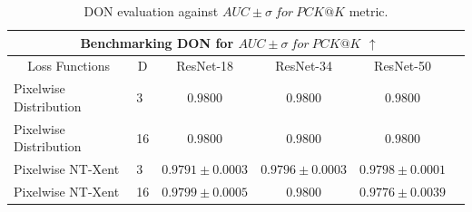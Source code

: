 \begin{table}[htb]
    \centering
    \begin{tabular}{lccccc}
        \hline
        \multicolumn{5}{c}{Benchmarking DON for $AUC \pm \sigma \ for \ PCK@K$ $\uparrow$}                                                                                                                 \\ \hline
        \multicolumn{1}{c}{Loss Functions}         & \multicolumn{1}{c|}{D}  & \multicolumn{1}{c}{\ac{ResNet}-18}      & \multicolumn{1}{c}{\ac{ResNet}-34}      & \multicolumn{1}{c}{\ac{ResNet}-50}      \\ \hline
        \multicolumn{1}{l}{Pixelwise Distribution} & \multicolumn{1}{l|}{3}  & \multicolumn{1}{c}{$\mathbf{0.9800}$}   & \multicolumn{1}{c}{$0.9800$}            & \multicolumn{1}{c}{$0.9800$}            \\
        \multicolumn{1}{l}{Pixelwise Distribution} & \multicolumn{1}{l|}{16} & \multicolumn{1}{c}{$0.9800$}            & \multicolumn{1}{c}{$0.9800$}            & \multicolumn{1}{c}{$0.9800$}            \\
        \multicolumn{1}{l}{Pixelwise NT-Xent}      & \multicolumn{1}{l|}{3}  & \multicolumn{1}{c}{$0.9791 \pm 0.0003$} & \multicolumn{1}{c}{$0.9796 \pm 0.0003$} & \multicolumn{1}{c}{$0.9798 \pm 0.0001$} \\
        \multicolumn{1}{l}{Pixelwise NT-Xent}      & \multicolumn{1}{l|}{16} & \multicolumn{1}{c}{$0.9799 \pm 0.0005$} & \multicolumn{1}{c}{$\mathbf{0.9800}$}   & \multicolumn{1}{c}{$0.9776 \pm 0.0039$} \\ \hline
    \end{tabular}
    \caption{DON evaluation against $AUC \pm \sigma \ for \ PCK@K$ metric.}
    \label{table:auc_don}
\end{table}


